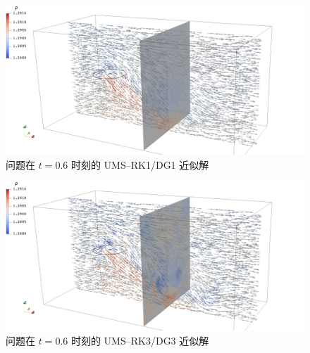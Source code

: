 \begin{figure}[h!]
\begin{centering}
\includegraphics[width=1\textwidth,height=0.26\textheight,keepaspectratio]{figures/forward/p=1/Frame60}
\par\end{centering}
\caption{\label{fig:forward_t=00003D6e-1_p=00003D1}问题在
$t=0.6$ 时刻的 UMS–RK1/DG1 近似解}
\end{figure}

\begin{figure}[h!]
\begin{centering}
\includegraphics[width=1\textwidth,height=0.26\textheight,keepaspectratio]{figures/forward/p=3/Frame60}
\par\end{centering}
\caption{\label{fig:forward_t=00003D6e-1_p=00003D3}问题在
$t=0.6$ 时刻的 UMS–RK3/DG3 近似解}
\end{figure}

